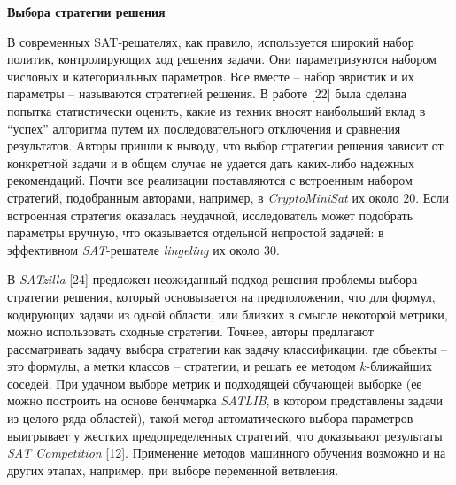 \textbf{Выбора стратегии решения}

В современных SAT-решателях, как правило, используется широкий набор политик, контролирующих ход решения задачи. Они параметризуются набором числовых и категориальных параметров. Все вместе – набор эвристик и их параметры – называются стратегией решения. В работе [22] была сделана попытка статистически оценить, какие из техник вносят наибольший вклад в \enquote{успех} алгоритма путем их последовательного отключения и сравнения результатов. Авторы пришли к выводу, что выбор стратегии решения зависит от конкретной задачи и в общем случае не удается дать каких-либо надежных рекомендаций. Почти все реализации поставляются с встроенным набором стратегий, подобранным авторами, 
например, в \textit{CryptoMiniSat} их около $20$. Если встроенная стратегия оказалась неудачной, исследователь может подобрать параметры вручную, что оказывается отдельной непростой задачей: в эффективном \textit{SAT}-решателе \textit{lingeling} их около 30.

В \textit{SATzilla} [24] предложен неожиданный подход решения проблемы выбора стратегии решения, который основывается на предположении, что для формул, кодирующих задачи из одной области, или близких в смысле некоторой метрики, можно использовать сходные стратегии. Точнее, авторы предлагают рассматривать задачу выбора стратегии как задачу классификации, где объекты – это формулы, а метки классов – стратегии, и решать ее методом $k$-ближайших соседей. При удачном выборе метрик и подходящей обучающей выборке (ее можно построить на основе бенчмарка \textit{SATLIB}, в котором представлены задачи из целого ряда областей), такой метод автоматического выбора параметров выигрывает у жестких предопределенных стратегий, что доказывают результаты \textit{SAT Competition} [12]. Применение методов машинного обучения возможно и на других этапах, например, при выборе переменной ветвления.

